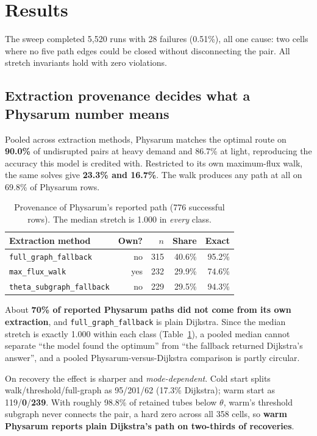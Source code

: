 \section{Results}

The sweep completed 5{,}520 runs with 28 failures (0.51\%), all one cause:
two cells where no five path edges could be closed without disconnecting the
pair. All stretch invariants hold with zero violations.

\subsection{Extraction provenance decides what a Physarum number means}
\label{sec:cprov}

Pooled across extraction methods, Physarum matches the optimal route on
\textbf{90.0\%} of undisrupted pairs at heavy demand and 86.7\% at light,
reproducing the accuracy this model is credited with. Restricted to its own
maximum-flux walk, the same solves give \textbf{23.3\% and 16.7\%}. The walk
produces any path at all on 69.8\% of Physarum rows.

\begin{table}[t]
\caption{Provenance of Physarum's reported path (776 successful rows). The
median stretch is 1.000 in \emph{every} class.}
\label{tab:cprov}
\centering
\begin{tabular}{lrrrr}
\toprule
Extraction method & Own? & $n$ & Share & Exact \\
\midrule
\texttt{full\_graph\_fallback}     & no  & 315 & 40.6\% & 95.2\% \\
\texttt{max\_flux\_walk}           & yes & 232 & 29.9\% & 74.6\% \\
\texttt{theta\_subgraph\_fallback} & no  & 229 & 29.5\% & 94.3\% \\
\bottomrule
\end{tabular}
\end{table}

About \textbf{70\% of reported Physarum paths did not come from its own
extraction}, and \texttt{full\_graph\_fallback} is plain Dijkstra. Since the
median stretch is exactly 1.000 within each class
(Table~\ref{tab:cprov}), a pooled median cannot separate ``the model found
the optimum'' from ``the fallback returned Dijkstra's answer'', and a pooled
Physarum-versus-Dijkstra comparison is partly circular.

On recovery the effect is sharper and \emph{mode-dependent}. Cold start
splits walk/threshold/full-graph as 95/201/62 (17.3\% Dijkstra); warm start
as 119/\textbf{0}/\textbf{239}. With roughly 98.8\% of retained tubes below
$\theta$, warm's threshold subgraph never connects the pair, a hard zero across all
358 cells, so \textbf{warm Physarum reports plain Dijkstra's
path on two-thirds of recoveries}.

